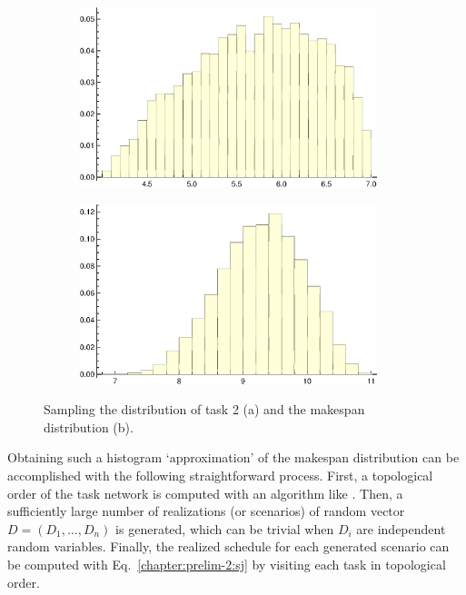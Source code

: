 	\begin{figure}
		\centering
		\begin{subfigure}[b]{0.45\textwidth}
			\centering
			\includegraphics[width=0.95\textwidth]{chapter/prelim-2/D2}
			\subcaption{}
			\label{chapter:prelim-2:example-2-a}
		\end{subfigure}
		\quad
		\begin{subfigure}[b]{0.45\textwidth}
			\centering
			\includegraphics[width=0.95\textwidth]{chapter/prelim-2/cmax}
			\subcaption{}
			\label{chapter:prelim-2:example-2-b}
		\end{subfigure}
		\caption{Sampling the distribution of task 2 (a) and the makespan distribution (b).}
		\label{chapter:prelim-2:example-2}
	\end{figure}

	Obtaining such a histogram `approximation' of the makespan distribution can be accomplished with the following straightforward process.
	First, a topological order of the task network is computed with an algorithm like \cite{tarjan1976}.
	Then, a sufficiently large number of realizations (or scenarios) of random vector $D=(D_1,\ldots,D_n)$ is generated,
	which can be trivial when $D_i$ are independent random variables.
	Finally, the realized schedule for each generated scenario can be computed with Eq.~\ref{chapter:prelim-2:sj} by visiting each task in topological order.
	
